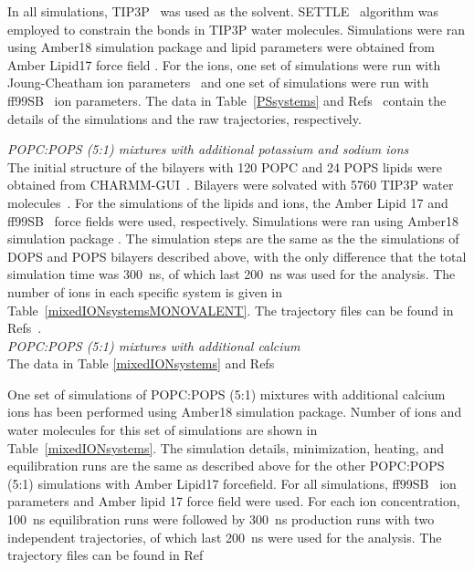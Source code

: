 \documentclass[journal=jpcbfk]{achemso}
\begin{document}
In all simulations, TIP3P~\cite{jorgensen1983comparison} was used as the solvent. SETTLE~\cite{miyamoto92} algorithm was employed 
to constrain the bonds in TIP3P water molecules. Simulations were ran using Amber18 
simulation package \cite{amber18md} and lipid parameters were obtained from Amber 
Lipid17 force field \cite{gould18}. For the ions, one set of simulations were run with 
Joung-Cheatham
ion parameters~\cite{joung2008determination} and one set of simulations were run with ff99SB~\cite{aqvist90} ion parameters. The data in Table~\ref{PSsystems} and Refs~ contain the details of the simulations and the raw trajectories, respectively.

\noindent
{\it POPC:POPS (5:1) mixtures with additional potassium and sodium ions} \\

The initial structure of the bilayers with 120 POPC and 24 POPS lipids were obtained from CHARMM-GUI~\cite{lee16,jo18}.
Bilayers were solvated with 5760 TIP3P water molecules~\cite{jorgensen1983comparison}. For the simulations of the lipids and ions,
the Amber Lipid 17 \cite{gould18} and ff99SB~\cite{aqvist90} force fields were used, respectively.
Simulations were ran using Amber18 simulation package \cite{amber18md}. The simulation 
steps are the same as the the simulations of
DOPS and POPS bilayers described above, with the only difference that the total simulation time was 300~ns, of which last 200~ns
was used for the analysis. The number of ions in each specific system is given in Table~\ref{mixedIONsystemsMONOVALENT}.
The trajectory files can be found in Refs~.\\

\noindent
{\it POPC:POPS (5:1) mixtures with additional calcium} \\
The data in Table \ref{mixedIONsystems} and Refs  

One set of simulations of POPC:POPS (5:1) mixtures with additional calcium ions has been performed using Amber18 simulation package. Number of ions and water molecules for this set of simulations are shown in Table~\ref{mixedIONsystems}. The simulation details, minimization, heating, and equilibration runs are the same as described above for the other POPC:POPS (5:1) simulations with Amber Lipid17 forcefield. For all simulations, ff99SB~\cite{aqvist90} ion parameters and Amber lipid 17 force field were used. For each ion concentration, 100~ns equilibration runs were followed by 300~ns production runs with two independent trajectories, of which last 200~ns were used for the analysis. The trajectory files can be found in Ref~ 
\end{document}
